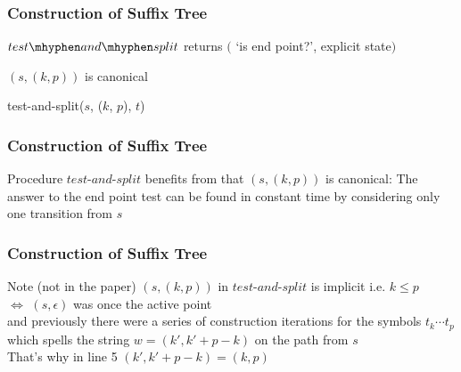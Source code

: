 \documentclass[compress,usenames,dvipsnames]{beamer}
\let\oldnl\nl%
\newcommand{\nonl}{\renewcommand{\nl}{\let\nl\oldnl}}%
\newenvironment{factblock}[1]{
    \setbeamercolor{block title}{bg=Apricot}
    \begin{block}{#1}}{\end{block}
}
\begin{document}
\begin{frame}\frametitle{Construction of Suffix Tree}
    $test\mhyphen and \mhyphen split$ returns $($ `is end point?', explicit state$)$ \\
    \hfill \break
    \LinesNumbered
    \begin{procedure}[H]
        \SetAlgoNoEnd
        \nonl $(s, (k, p))$ is canonical
        \caption{test-and-split($s$, ($k$, $p$), $t$)}
    \end{procedure}
\end{frame}

\begin{frame}\frametitle{Construction of Suffix Tree}
    Procedure $test$-$and$-$split$ benefits from that $(s, (k, p))$ is canonical: The answer to the end point test can be found in constant time by considering only one transition from $s$
\end{frame}

\begin{frame}\frametitle{Construction of Suffix Tree}
    \begin{factblock}{Note (not in the paper)}
        $(s, (k, p))$ in $test$-$and$-$split$ is implicit i.e. $k \leq p$ \\
        $\Leftrightarrow$ $(s, \epsilon)$ was once the active point \\
        \hspace{16pt} and previously there were a series of construction iterations for the symbols $t_k\cdots t_p$ which spells the string $w = (k', k' + p - k)$ on the path from $s$\\
        \hfill \break
        That's why in line 5 $(k', k' + p - k) = (k, p)$
    \end{factblock}
\end{frame}
\end{document}
